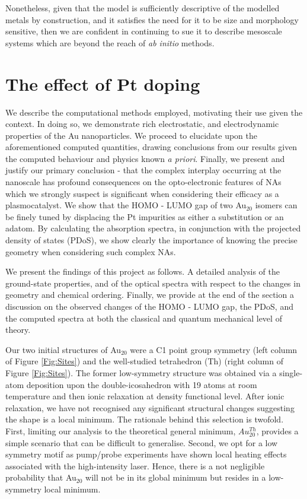 Nonetheless, given that the model is sufficiently descriptive of the modelled metals by construction, and it satisfies the need for it to be size and morphology sensitive, then we are confident in continuing to sue it to describe mesoscale systems which are beyond the reach of \textit{ab initio} methods.

\clearpage
\section{The effect of Pt doping}
\label{sec:AuPt_DFT}

We describe the computational methods employed, motivating their use given the context. In doing so, we demonstrate rich electrostatic, and electrodynamic properties of the Au nanoparticles. We proceed to elucidate upon the aforementioned computed quantities, drawing conclusions from our results given the computed behaviour and physics known \textit{a priori}. Finally, we present and justify our primary conclusion - that the complex interplay occurring at the nanoscale has profound consequences on the opto-electronic features of NAs which we strongly suspect is significant when considering their efficacy as a plasmocatalyst. We show that the HOMO - LUMO gap of two Au$_{20}$ isomers can be finely tuned by displacing the Pt impurities as either a substitution or an adatom. By calculating the absorption spectra, in conjunction with the projected density of states (PDoS), we show clearly the importance of knowing the precise geometry when considering such complex NAs.

We present the findings of this project as follows. A detailed analysis of the ground-state properties, and of the optical spectra with respect to the changes in geometry and chemical ordering. Finally, we provide at the end of the section a discussion on the observed changes of the HOMO - LUMO gap, the PDoS, and the computed spectra at both the classical and quantum mechanical level of theory.

Our two initial structures of Au$_{20}$ were a C1 point group symmetry (left column of Figure \ref{Fig:Sites}) and the well-studied tetrahedron (Th) (right column of Figure \ref{Fig:Sites}). The former low-symmetry structure was obtained via a single-atom deposition upon the double-icosahedron with 19 atoms at room temperature and then ionic relaxation at density functional level. After ionic relaxation, we have not recognised any significant structural changes suggesting the shape is a local minimum. The rationale behind this selection is twofold. First, limiting our analysis to the theoretical general minimum, $Au^{Th}_{20}$, provides a simple scenario that can be difficult to generalise. Second, we opt for a low symmetry motif as pump/probe experiments have shown local heating effects associated with the high-intensity laser. Hence, there is a not negligible probability that Au$_{20}$ will not be in its global minimum but resides in a low-symmetry local minimum.

